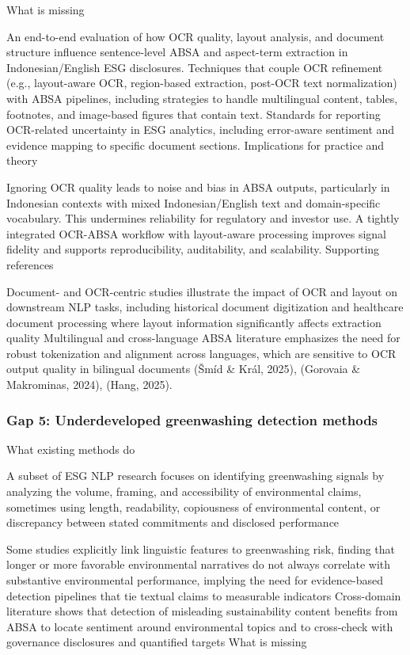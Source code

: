 What is missing

An end-to-end evaluation of how OCR quality, layout analysis, and document structure influence sentence-level ABSA and aspect-term extraction in Indonesian/English ESG disclosures.
Techniques that couple OCR refinement (e.g., layout-aware OCR, region-based extraction, post-OCR text normalization) with ABSA pipelines, including strategies to handle multilingual content, tables, footnotes, and image-based figures that contain text.
Standards for reporting OCR-related uncertainty in ESG analytics, including error-aware sentiment and evidence mapping to specific document sections.
Implications for practice and theory

Ignoring OCR quality leads to noise and bias in ABSA outputs, particularly in Indonesian contexts with mixed Indonesian/English text and domain-specific vocabulary. This undermines reliability for regulatory and investor use.
A tightly integrated OCR-ABSA workflow with layout-aware processing improves signal fidelity and supports reproducibility, auditability, and scalability.
Supporting references

Document- and OCR-centric studies illustrate the impact of OCR and layout on downstream NLP tasks, including historical document digitization and healthcare document processing where layout information significantly affects extraction quality \cite{10.1108/jd-03-2023-0055,10.1093/jamiaopen/ooac045,10.1109/icdar.2011.302,10.21203/rs.3.rs-6644838/v1,10.1145/3151509.3151525,10.1145/3167132.3167236,10.1145/3322905.3322909}
Multilingual and cross-language ABSA literature emphasizes the need for robust tokenization and alignment across languages, which are sensitive to OCR output quality in bilingual documents (Šmíd & Král, 2025), (Gorovaia & Makrominas, 2024), (Hang, 2025).

\subsubsection{Gap 5: Underdeveloped greenwashing detection methods}
What existing methods do

A subset of ESG NLP research focuses on identifying greenwashing signals by analyzing the volume, framing, and accessibility of environmental claims, sometimes using length, readability, copiousness of environmental content, or discrepancy between stated commitments and disclosed performance \cite{10.1111/eufm.12509,10.3389/frai.2025.1616007,10.3897/rio.6.e57602}

Some studies explicitly link linguistic features to greenwashing risk, finding that longer or more favorable environmental narratives do not always correlate with substantive environmental performance, implying the need for evidence-based detection pipelines that tie textual claims to measurable indicators \cite{10.1111/eufm.12509}
Cross-domain literature shows that detection of misleading sustainability content benefits from ABSA to locate sentiment around environmental topics and to cross-check with governance disclosures and quantified targets \cite{10.1111/eufm.12509,10.69593/ajbais.v4i04.130}
What is missing

